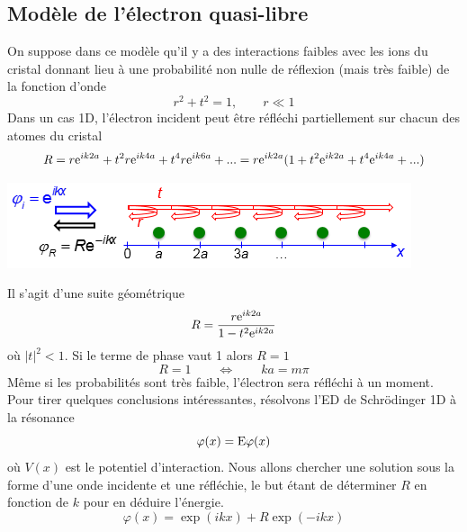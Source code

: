 	
	\subsection{Modèle de l'électron quasi-libre}	
	On suppose dans ce modèle qu'il y a des interactions faibles avec les ions du cristal 
	donnant lieu à une probabilité non nulle de réflexion (mais très faible) de la fonction 
	d'onde
	\begin{equation}
	r^2+t^2 = 1,\qquad r\ll 1
	\end{equation}
	Dans un cas 1D, l'électron incident peut être réfléchi partiellement sur chacun des 
	atomes du cristal
	\begin{equation}
	R = r{{\rm{e}}^{ik2a}} + {t^2}r{{\rm{e}}^{ik4a}} + {t^4}r{{\rm{e}}^{ik6a}} + ... =
	r{{\rm{e}}^{ik2a}}(1 + {t^2}{{\rm{e}}^{ik2a}} + {t^4}{{\rm{e}}^{ik4a}} + ...)
	\end{equation}
	\begin{center}
	\includegraphics[scale=0.7]{ch5/image3}
	\end{center}
	Il s'agit d'une suite géométrique 
	\begin{equation}
	R = \frac{{r{{\rm{e}}^{ik2a}}}}{{1 - {t^2}{{\rm{e}}^{ik2a}}}}
	\end{equation}
	où $|t|^2 <1$. Si le terme de phase vaut 1 alors $R=1$
	\begin{equation}
	R = 1\qquad\Leftrightarrow\qquad ka=m\pi
	\end{equation}
	Même si les probabilités sont très faible, l'électron sera réfléchi à un moment.\\
	
	Pour tirer quelques conclusions intéressantes, résolvons l'ED de Schrödinger 1D à la 
	résonance
	\begin{equation}
	[ - \frac{{{\hbar ^2}}}{{2{m_e}}}\frac{{{{\rm{d}}^2}}}{{{\rm{d}}{x^2}}} + V(x)]\varphi (x) = {\rm{E}}\varphi (x)
	\end{equation}
	où $V(x)$ est le potentiel d'interaction. Nous allons chercher une solution sous la forme 
	d'une onde incidente et une réfléchie, le but étant de déterminer $R$ en fonction de $k$ 
	pour en déduire l'énergie.
	\begin{equation}
	\varphi (x) = \exp (ikx) + R\exp ( - ikx)
	\end{equation}


